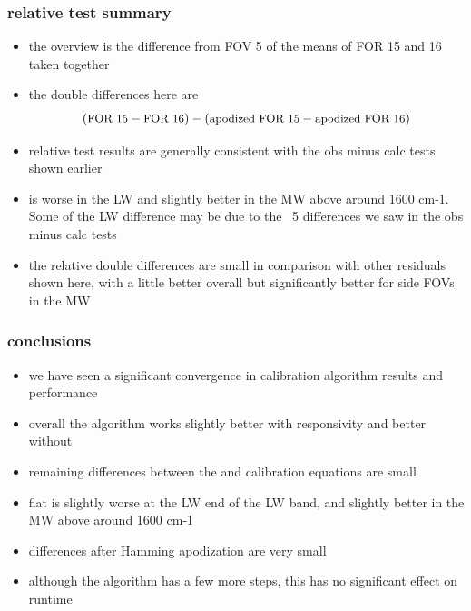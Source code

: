 \documentclass[11pt]{beamer}
\begin{document}
\begin{frame}
\frametitle{relative test summary}

\begin{itemize}

  \item the overview is the difference from FOV 5 of the means of
    FOR 15 and 16 taken together

  \item the double differences here are \[(\mbox{\small FOR 15} -
    \mbox{\small FOR 16}) - (\mbox{\small apodized FOR 15} -
    \mbox{\small apodized FOR 16})\]

  \item relative test results are generally consistent with the obs
    minus calc tests shown earlier

  \item {\ccast} is worse in the LW and slightly better in the MW
    above around 1600 cm-1.  Some of the LW difference may be due to
    the \fov~5 differences we saw in the obs minus calc tests

  \item the relative double differences are small in comparison with
    other residuals shown here, with {\noaa} a little better overall
    but {\ccast} significantly better for side FOVs in the MW

\end{itemize}

\end{frame}
\begin{frame}
\frametitle{conclusions}

\begin{itemize}

  \item we have seen a significant convergence in calibration
    algorithm results and performance

  \item overall the {\noaa} algorithm works slightly better with
    responsivity and {\ccast} better without

  \item remaining differences between the {\ccast} and {\noaa}
    calibration equations are small

  \item {\ccast} flat is slightly worse at the LW end of the LW
    band, and slightly better in the MW above around 1600 cm-1

  \item differences after Hamming apodization are very small

  \item although the {\noaa} algorithm has a few more steps, this
    has no significant effect on runtime

\end{itemize}

\end{frame}
\end{document}
